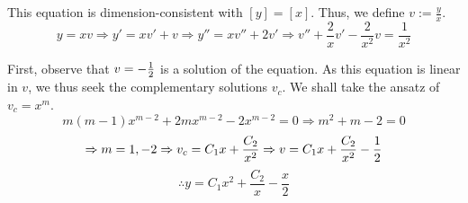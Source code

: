 \item

This equation is dimension-consistent with $[y] = [x]$.
Thus, we define $v := \frac{y}{x}$.
\[
	y = xv
	\Rightarrow y' = xv' + v
	\Rightarrow y'' = xv'' + 2v'
	\Rightarrow v'' + \frac{2}{x} v' - \frac{2}{x^2} v = \frac{1}{x^2}
\]

First, observe that $v = -\frac{1}{2}$ is a solution of the equation.
As this equation is linear in $v$, we thus seek the complementary solutions $v_c$.
We shall take the ansatz of $v_c = x^m$.
\[
	m(m - 1)x^{m - 2} + 2mx^{m - 2} - 2x^{m - 2} = 0
	\Rightarrow m^2 + m - 2 = 0
\]
\[
	\Rightarrow m = 1, -2
	\Rightarrow v_c = C_1 x + \frac{C_2}{x^2}
	\Rightarrow v = C_1 x + \frac{C_2}{x^2} - \frac{1}{2}
\]
\[
	\therefore y = C_1 x^2 + \frac{C_2}{x} - \frac{x}{2}
\]